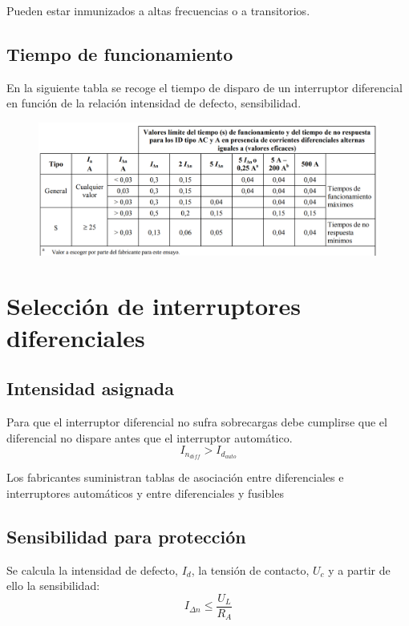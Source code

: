 Pueden estar inmunizados a altas frecuencias o a transitorios.

\subsection{Tiempo de funcionamiento}
En la siguiente tabla se recoge el tiempo de disparo de un interruptor diferencial en función de la relación intensidad de defecto, sensibilidad.

	\begin{figure} [H]
		\centering
		\includegraphics[width=0.7\linewidth]{Images/28}
		\label{fig:28}
	\end{figure}
	


\section{Selección de interruptores diferenciales}
\subsection{Intensidad asignada}
Para que el interruptor diferencial no sufra sobrecargas debe cumplirse que el diferencial no dispare antes que el interruptor automático.
\begin{equation}
	I_{n_{diff}}> I_{d_{auto}}
\end{equation}

Los fabricantes suministran tablas de asociación entre diferenciales e interruptores automáticos y entre diferenciales y fusibles
\subsection{Sensibilidad para protección}
Se calcula la intensidad de defecto, $I_d$, la tensión de contacto, $U_c$ y a partir de ello la sensibilidad:
\begin{equation}
	I_{\Delta n}\le \dfrac{U_L}{R_A}
\end{equation}

